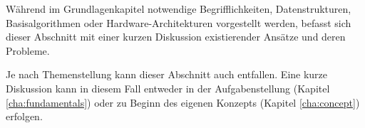 Während im Grundlagenkapitel notwendige Begrifflichkeiten, Datenstrukturen, Basisalgorithmen oder Hardware-Architekturen vorgestellt werden, befasst sich dieser Abschnitt mit einer kurzen Diskussion existierender Ansätze und deren Probleme.

Je nach Themenstellung kann dieser Abschnitt auch entfallen. Eine kurze Diskussion kann in diesem Fall entweder in der Aufgabenstellung (Kapitel \ref{cha:fundamentals}) oder zu Beginn des eigenen Konzepts (Kapitel \ref{cha:concept}) erfolgen. 
